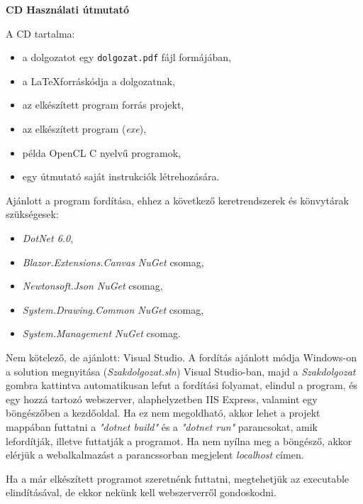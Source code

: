 \pagestyle{empty}

\noindent \textbf{\Large CD Használati útmutató}

\vskip 1cm

A CD tartalma:
\begin{itemize}
\item a dolgozatot egy \texttt{dolgozat.pdf} fájl formájában,
\item a \LaTeX forráskódja a dolgozatnak,
\item az elkészített program forrás projekt,
\item az elkészített program (\textit{exe}),
\item példa OpenCL C nyelvű programok,
\item egy útmutató saját instrukciók létrehozására.
\end{itemize}

Ajánlott a program fordítása, ehhez a következő keretrendszerek és könvytárak szükségesek: 
\begin{itemize}
\item \textit{DotNet 6.0},
\item \textit{Blazor.Extensions.Canvas NuGet} csomag,
\item \textit{Newtonsoft.Json NuGet} csomag,
\item \textit{System.Drawing.Common NuGet} csomag,
\item \textit{System.Management  NuGet} csomag.
\end{itemize}

Nem kötelező, de ajánlott: Visual Studio.
A fordítás ajánlott módja Windows-on a solution megnyitása (\textit{Szakdolgozat.sln}) Visual Studio-ban, majd a \textit{Szakdolgozat} gombra kattintva automatikusan lefut a fordítási folyamat, elindul a program, és egy hozzá tartozó webszerver, alaphelyzetben IIS Express, valamint egy böngészőben a kezdőoldal.
Ha ez nem megoldható, akkor lehet a projekt mappában futtatni a \textit{"dotnet build"} és a \textit{"dotnet run"} parancsokat, amik lefordítják, illetve futtatják a programot. Ha nem nyílna meg a böngésző, akkor elérjük a webalkalmazást a parancssorban megjelent \textit{localhost} címen.

Ha a már elkészített programot szeretnénk futtatni, megtehetjük az executable elindításával, de ekkor nekünk kell webszerverről gondoskodni.

